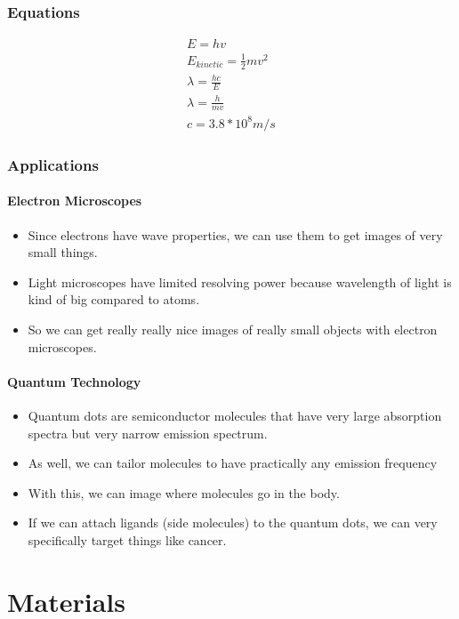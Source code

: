 \documentclass[a4paper,12pt]{report}
\begin{document}
\subsection{Equations}
\begin{eqnarray}
E = hv \\
E_{kinetic} = \frac{1}{2}mv^2 \\
\lambda = \frac{hc}{E} \\
\lambda = \frac{h}{mv} \\
c = 3.8*10^8 m/s 
\end{eqnarray}

\subsection{Applications}
\subsubsection{Electron Microscopes}
\begin{itemize}
\item Since electrons have wave properties, we can use them to get images of very small things.
\item Light microscopes have limited resolving power because wavelength of light is kind of big compared to atoms.
\item So we can get really really nice images of really small objects with electron microscopes.
\end{itemize} 
\subsubsection{Quantum Technology}
\begin{itemize}
\item Quantum dots are semiconductor molecules that have very large absorption spectra but very narrow emission spectrum.
\item As well, we can tailor molecules to have practically any emission frequency
\item With this, we can image where molecules go in the body.
\item If we can attach ligands (side molecules) to the quantum dots, we can very specifically target things like cancer.
\end{itemize}
\chapter{Materials}
\end{document}
